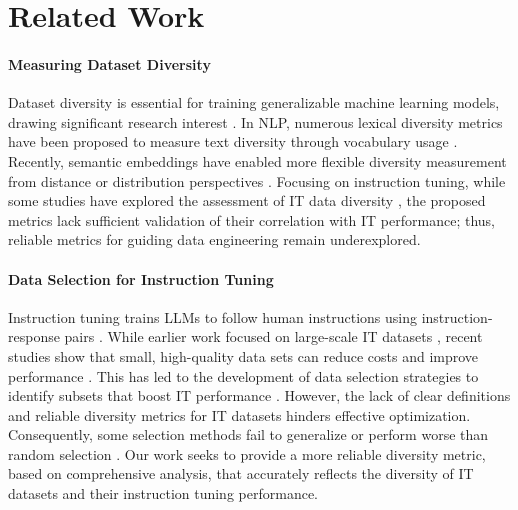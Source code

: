 \section{Related Work}
\paragraph{Measuring Dataset Diversity}


Dataset diversity is essential for training generalizable machine learning models, drawing significant research interest \cite{sun2024diversity-CV, zhao2024measuring, qin2024unleashing}. In NLP, numerous lexical diversity metrics have been proposed to measure text diversity through vocabulary usage \cite{richards1987type-TTR, malvern2004lexical-vocd}. Recently, semantic embeddings have enabled more flexible diversity measurement from distance \cite{stasaski2022semantic-KNN, du2019boosting-Inertia, dang2024data} or distribution perspectives \cite{shao2024balanced}. Focusing on instruction tuning, while some studies have explored the assessment of IT data diversity \cite{wang2024diversity-logD, bukharin2023data-QDIT}, the proposed metrics lack sufficient validation of their correlation with IT performance; thus, reliable metrics for guiding data engineering remain underexplored.

\paragraph{Data Selection for Instruction Tuning}
Instruction tuning trains LLMs to follow human instructions using instruction-response pairs \cite{zhang2023instruction}. While earlier work focused on large-scale IT datasets \cite{longpre2023flan, chiang2023vicuna-ShareGPT}, recent studies show that small, high-quality data sets can reduce costs and improve performance \cite{chen2023maybe-Kcentergreedy, zhou2024lima, dou2024loramoe, ye2024empirical}. This has led to the development of data selection strategies to identify subsets that boost IT performance \cite{liu2023makes, du2023mods-Kcentergreedy, wu2023self-Kcentergreedy, song2024iterselecttune-Kmeans, yang2024beyond}. However, the lack of clear definitions and reliable diversity metrics for IT datasets hinders effective optimization. Consequently, some selection methods fail to generalize or perform worse than random selection \cite{xia2024rethinking,diddee2024chasing}. Our work seeks to provide a more reliable diversity metric, based on comprehensive analysis, that accurately reflects the diversity of IT datasets and their instruction tuning performance.
